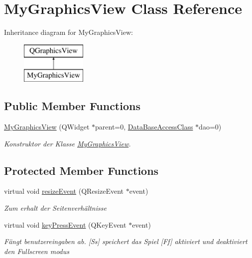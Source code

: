 \hypertarget{class_my_graphics_view}{\section{My\-Graphics\-View Class Reference}
\label{class_my_graphics_view}
}
Inheritance diagram for My\-Graphics\-View\-:\begin{figure}[H]
\begin{center}
\leavevmode
\includegraphics[height=2.000000cm]{class_my_graphics_view}
\end{center}
\end{figure}
\subsection*{Public Member Functions}
\begin{DoxyCompactItemize}
\item 
\hyperlink{class_my_graphics_view_ae55142e35dbafe5f76fa9fb5b7563ec8}{My\-Graphics\-View} (Q\-Widget $\ast$parent=0, \hyperlink{class_data_base_access_class}{Data\-Base\-Access\-Class} $\ast$dao=0)
\begin{DoxyCompactList}\small\item\em Konstruktor der Klasse \hyperlink{class_my_graphics_view}{My\-Graphics\-View}. \end{DoxyCompactList}\end{DoxyCompactItemize}
\subsection*{Protected Member Functions}
\begin{DoxyCompactItemize}
\item 
virtual void \hyperlink{class_my_graphics_view_a93b12d4302622836f0150a8b56ff3c9f}{resize\-Event} (Q\-Resize\-Event $\ast$event)
\begin{DoxyCompactList}\small\item\em Zum erhalt der Seitenverhältnisse \end{DoxyCompactList}\item 
virtual void \hyperlink{class_my_graphics_view_a9816bdd436d67c34f1b0d8feed15d47d}{key\-Press\-Event} (Q\-Key\-Event $\ast$event)
\begin{DoxyCompactList}\small\item\em Fängt benutzereingaben ab. \mbox{[}Ss\mbox{]} speichert das Spiel \mbox{[}Ff\mbox{]} aktiviert und deaktiviert den Fullscreen modus \end{DoxyCompactList}\end{DoxyCompactItemize}


